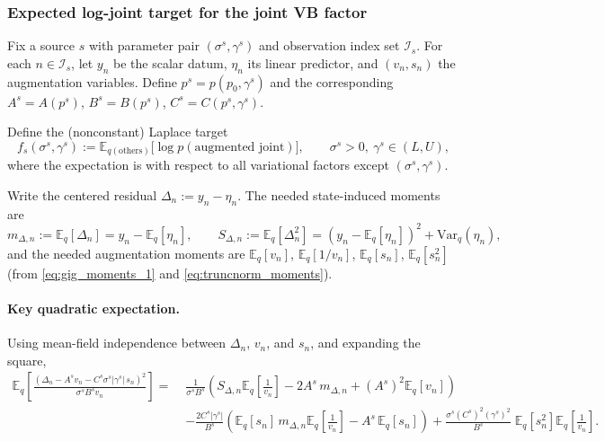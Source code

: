 \documentclass[11pt]{article}
\newcommand{\1}{\mathbb{I}}
\newcommand{\E}{\mathbb{E}}
\newcommand{\Var}{\mathrm{Var}}
\begin{document}
\subsubsection*{Expected log-joint target for the joint VB factor}

Fix a source $s$ with parameter pair $(\sigma^s,\gamma^s)$ and observation index set $\mathcal{I}_s$.
For each $n\in\mathcal{I}_s$, let $y_n$ be the scalar datum, $\eta_n$ its linear predictor,
and $(v_n,s_n)$ the augmentation variables. Define
$p^s=p(p_0,\gamma^s)$ and the corresponding $A^s=A(p^s)$, $B^s=B(p^s)$, $C^s=C(p^s,\gamma^s)$.

Define the (nonconstant) Laplace target
\begin{equation}
f_s(\sigma^s,\gamma^s)
:=
\E_{q(\text{others})}\!\big[\log p(\text{augmented joint})\big],
\qquad \sigma^s>0,\ \gamma^s\in(L,U),
\label{eq:fs_def}
\end{equation}
where the expectation is with respect to all variational factors except $(\sigma^s,\gamma^s)$.

Write the centered residual $\Delta_n := y_n-\eta_n$. The needed state-induced moments are
\begin{equation}
m_{\Delta,n}:=\E_q[\Delta_n]=y_n-\E_q[\eta_n],
\qquad
S_{\Delta,n}:=\E_q[\Delta_n^2]=(y_n-\E_q[\eta_n])^2+\Var_q(\eta_n),
\label{eq:delta_moments}
\end{equation}
and the needed augmentation moments are $\E_q[v_n]$, $\E_q[1/v_n]$, $\E_q[s_n]$, $\E_q[s_n^2]$
(from \eqref{eq:gig_moments_1} and \eqref{eq:truncnorm_moments}).

\paragraph{Key quadratic expectation.}
Using mean-field independence between $\Delta_n$, $v_n$, and $s_n$, and expanding the square,
\begin{align}
\E_q\!\left[\frac{(\Delta_n-A^s v_n-C^s\sigma^s|\gamma^s|\,s_n)^2}{\sigma^s B^s v_n}\right]
=\;&
\frac{1}{\sigma^s B^s}\left(
S_{\Delta,n}\E_q\!\left[\frac{1}{v_n}\right]
-2A^s\,m_{\Delta,n}
+(A^s)^2\E_q[v_n]\right)\nonumber\\
&-\frac{2C^s|\gamma^s|}{B^s}\left(
\E_q[s_n]\,m_{\Delta,n}\E_q\!\left[\frac{1}{v_n}\right]
-A^s\,\E_q[s_n]\right)
+\frac{\sigma^s (C^s)^2(\gamma^s)^2}{B^s}\;\E_q[s_n^2]\E_q\!\left[\frac{1}{v_n}\right].
\label{eq:quad_expectation_expand_ld}
\end{align}
\end{document}
